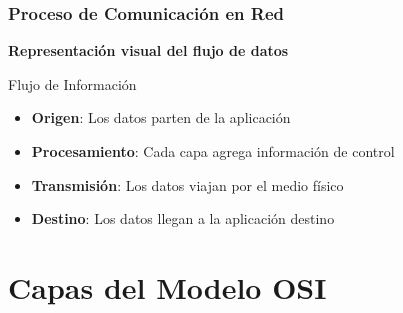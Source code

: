 \documentclass[aspectratio=169]{beamer}
\begin{document}
            \begin{frame}
            \frametitle{Proceso de Comunicación en Red}
            
            \begin{center}
            \Large \textbf{Representación visual del flujo de datos}
            \end{center}
            
            \begin{block}{Flujo de Información}
            \begin{itemize}
            \item \textbf{Origen}: Los datos parten de la aplicación
            \item \textbf{Procesamiento}: Cada capa agrega información de control
            \item \textbf{Transmisión}: Los datos viajan por el medio físico
            \item \textbf{Destino}: Los datos llegan a la aplicación destino
            \end{itemize}
            \end{block}
            \end{frame}
            
            \section{Capas del Modelo OSI}
            
\end{document}
